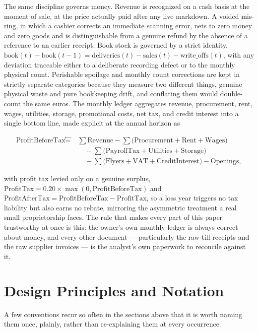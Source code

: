 \documentclass[12pt,a4paper]{article}
\begin{document}
The same discipline governs money. Revenue is recognized on a cash basis
at the moment of sale, at the price actually paid after any live
markdown. A voided mis-ring, in which a cashier corrects an immediate
scanning error, nets to zero money and zero goods and is distinguishable
from a genuine refund by the absence of a reference to an earlier
receipt. Book stock is governed by a strict identity, $\text{book}(t) -
\text{book}(t-1) = \text{deliveries}(t) - \text{sales}(t) -
\text{write\_offs}(t)$, with any deviation traceable either to a
deliberate recording defect or to the monthly physical count. Perishable
spoilage and monthly count corrections are kept in strictly separate
categories because they measure two different things, genuine physical
waste and pure bookkeeping drift, and conflating them would double-count
the same euros. The monthly ledger aggregates revenue, procurement,
rent, wages, utilities, storage, promotional costs, net tax, and credit
interest into a single bottom line, made explicit at the annual horizon
as

\begin{align*}
\text{ProfitBeforeTax} \overset{\leftarrow}{=}\ & \sum \text{Revenue} -
\sum\big(\text{Procurement} + \text{Rent} + \text{Wages}\big) \\
&\quad {} - \sum\big(\text{PayrollTax} + \text{Utilities} +
\text{Storage}\big) \\
&\quad {} - \sum\big(\text{Flyers} + \text{VAT} +
\text{CreditInterest}\big) - \text{Openings},
\end{align*}

with profit tax levied only on a genuine surplus,
$\text{ProfitTax} = 0.20\times\max(0,\text{ProfitBeforeTax})$ and
$\text{ProfitAfterTax} = \text{ProfitBeforeTax} - \text{ProfitTax}$, so a
loss year triggers no tax liability but also earns no rebate, mirroring
the asymmetric treatment a real small proprietorship faces. The rule
that makes every part of this paper trustworthy at once is this: the
owner's own monthly ledger is always correct about money, and every
other document --- particularly the raw till receipts and the raw
supplier invoices --- is the analyst's own paperwork to reconcile
against it.

\section{Design Principles and Notation}
\label{sec:principles}

A few conventions recur so often in the sections above that it is worth
naming them once, plainly, rather than re-explaining them at every
occurrence.
\end{document}
